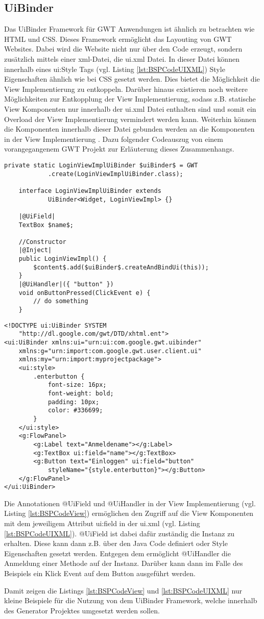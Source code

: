 \subsection{UiBinder}
\label{UiBinder}
Das UiBinder Framework für GWT Anwendungen ist ähnlich zu betrachten wie HTML
und CSS. Dieses Framework ermöglicht das Layouting von GWT Websites. Dabei
wird die Website nicht nur über den Code erzeugt, sondern zusätzlich mittels
einer xml-Datei, die ui.xml Datei. In dieser Datei können innerhalb eines ui:Style
Tags (vgl. Listing \ref{lst:BSPCodeUIXML}) Style
Eigenschaften ähnlich wie bei CSS gesetzt werden. Dies bietet die Möglichkeit die
View Implementierung zu entkoppeln. Darüber hinaus existieren noch weitere
Möglichkeiten zur Entkopplung der View Implementierung, sodass z.B.
statische View Komponenten nur innerhalb der ui.xml
Datei enthalten sind und somit ein Overload der View Implementierung vermindert
werden kann. Weiterhin können die Komponenten innerhalb dieser Datei gebunden
werden an die Komponenten in der View Implementierung \cite{bib:uiBind}. Dazu
folgender Codeauszug von einem vorangegangenem GWT Projekt zur Erläuterung dieses Zusammenhangs.\\
\lstset{language=gwt}
\begin{lstlisting}[caption={Beispielcode UiBinder in View
Implementierung}, label={lst:BSPCodeView}]
	private static LoginViewImplUiBinder $uiBinder$ = GWT
			.create(LoginViewImplUiBinder.class);

	interface LoginViewImplUiBinder extends 
			UiBinder<Widget, LoginViewImpl> {}

	|@UiField|
	TextBox $name$;
		
	//Constructor
	|@Inject|
	public LoginViewImpl() {
		$content$.add($uiBinder$.createAndBindUi(this));
	}
	|@UiHandler|({ "button" })
	void onButtonPressed(ClickEvent e) {
		// do something
	}
\end{lstlisting}
\lstset{language=uixml}
\begin{lstlisting}[caption={Beispielcode UiBinder in ui.xml},
label={lst:BSPCodeUIXML}]
<!DOCTYPE ui:UiBinder SYSTEM 
	"http://dl.google.com/gwt/DTD/xhtml.ent">
<ui:UiBinder xmlns:ui="urn:ui:com.google.gwt.uibinder"
	xmlns:g="urn:import:com.google.gwt.user.client.ui"
	xmlns:my="urn:import:myprojectpackage">
	<ui:style>
		.enterbutton {
			font-size: 16px;
			font-weight: bold;
			padding: 10px;
			color: #336699;
		}
	</ui:style>
	<g:FlowPanel>
		<g:Label text="Anmeldename"></g:Label>
		<g:TextBox ui:field="name"></g:TextBox>
		<g:Button text="Einloggen" ui:field="button" 
			styleName="{style.enterbutton}"></g:Button>
	</g:FlowPanel> 
</ui:UiBinder> 
\end{lstlisting}
Die Annotationen @UiField und @UiHandler in der View Implementierung (vgl.
Listing \ref{lst:BSPCodeView}) ermöglichen den Zugriff auf die View Komponenten
mit dem jeweiligem Attribut ui:field in der ui.xml (vgl. Listing
\ref{lst:BSPCodeUIXML}). @UiField ist dabei dafür zuständig die Instanz zu
erhalten. Diese kann dann z.B. über den Java Code definiert oder Style
Eigenschaften gesetzt werden. Entgegen dem ermöglicht @UiHandler die Anmeldung
einer Methode auf der Instanz. Darüber kann dann im Falle des Beispiels ein
Klick Event auf dem Button ausgeführt werden.

Damit zeigen die Listings \ref{lst:BSPCodeView} und \ref{lst:BSPCodeUIXML}
nur kleine Beispiele für die Nutzung von dem UiBinder Framework, welche
innerhalb des Generator Projektes umgesetzt werden sollen.



